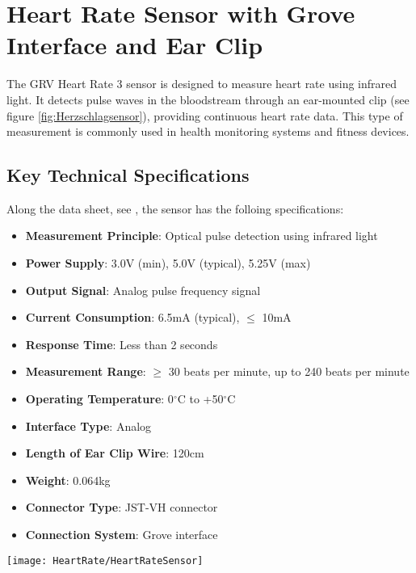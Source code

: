 \section{Heart Rate Sensor with Grove Interface and Ear Clip}

The GRV Heart Rate 3 sensor is designed to measure heart rate using infrared light. It detects pulse waves in the bloodstream through an ear-mounted clip (see figure \ref{fig:Herzschlagsensor}), providing continuous heart rate data. This type of measurement is commonly used  in health monitoring systems and fitness devices.
\cite{Seeed:2024}

\subsection{Key Technical Specifications}

Along the data sheet, see \cite{Seeed:2024}, the sensor has the folloing specifications:

\begin{itemize}
  \item \textbf{Measurement Principle}: Optical pulse detection using infrared light
  \item \textbf{Power Supply}: 3.0V (min), 5.0V (typical), 5.25V (max)
  \item \textbf{Output Signal}: Analog pulse frequency signal
  \item \textbf{Current Consumption}: 6.5mA (typical), $\leq$ 10mA
  \item \textbf{Response Time}: Less than 2 seconds
  \item \textbf{Measurement Range}: $\geq$ 30 beats per minute, up to 240 beats per minute
  \item \textbf{Operating Temperature}: 0$^\circ$C to +50$^\circ$C
  \item \textbf{Interface Type}: Analog
  \item \textbf{Length of Ear Clip Wire}: 120cm
  \item \textbf{Weight}: 0.064kg
  \item \textbf{Connector Type}: JST-VH connector
  \item \textbf{Connection System}: Grove interface
\end{itemize}




\begin{center}
    \texttt{[image: HeartRate/HeartRateSensor]}
    \label{fig:Herzschlagsensor}
\end{center}



